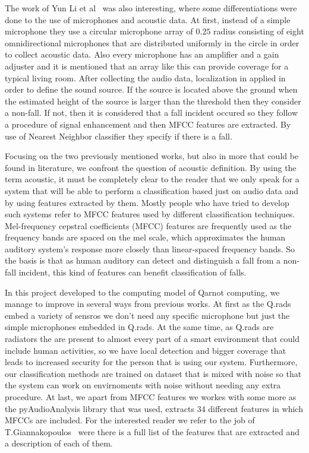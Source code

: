 \documentclass[10pt, conference, compsocconf]{IEEEtran}
\begin{document}
The work of Yun Li et al~\cite{Yun2012} was also interesting, where some differentiations were done to the use of microphones and acoustic data. At first, instead of a simple microphone they use a circular microphone array of $0.25$ radius consisting of eight omnidirectional microphones that are distributed uniformly in the circle in order to collect acoustic data. Also every microphone has an amplifier and a gain adjuster and it is mentioned that an array like this can provide coverage for a typical living room. After collecting the audio data, localization in applied in order to define the sound source. If the source is located above the ground when the estimated height of the source is larger than the threshold then they consider a non-fall. If not, then it is considered that a fall incident occured so they follow a procedure of signal enhancement and then MFCC features are extracted. By use of Nearest Neighbor classifier they specify if there is a fall. 

Focusing on the two previously mentioned works, but also in more that could be found in literature, we confront the question of acoustic definition. By using the term acoustic, it must be completely clear to the reader that we only speak for a system that will be able to perform a classification based just on audio data and by using features extracted by them. Mostly people who have tried to develop such systems refer to MFCC features used by different classification techniques. Mel-frequency cepstral coefficients (MFCC) features are frequently used as the frequency bands are spaced on the mel scale, which approximates the human auditory system's response more closely than linear-spaced frequency bands. So the basis is that as human auditory can detect and distinguish a fall from a non-fall incident, this kind of features can benefit classification of falls. 

In this project developed to the computing model of Qarnot computing, we manage to improve in several ways from previous works. At first as the Q.rads embed a variety of sensros we don't need any specific microphone but just the simple microphones embedded in Q.rads. At the same time, as Q.rads are radiators the are present to almost every part of a smart environment that could include human activities, so we have local detection and bigger coverage that leads to increased security for the person that is using our system. Furthermore, our classification methods are trained on dataset that is mixed with noise so that the system can work on envirnoments with noise without needing any extra procedure. At last, we apart from MFCC features we workes with some more as the pyAudioAnalysis library that was used, extracts 34 different features in which MFCCs are included. For the interested reader we refer to the job of T.Giannakopoulos~\cite{giannakopoulos2015pyaudioanalysis} were there is a full list of the features that are extracted and a description of each of them.         
 
\end{document}
